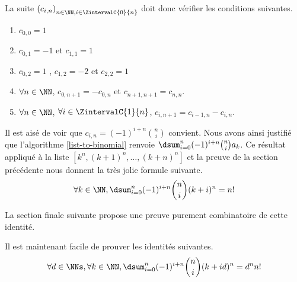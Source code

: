 La suite $\left(  c_{i,n} \right)_{n \in \NN , i \in \ZintervalC{0}{n}}$ doit donc vérifier les conditions suivantes.

\begin{enumerate}
	\item $c_{0,0} = 1$
	
	\item $c_{0,1} = -1$ et $c_{1, 1} = 1$

	\item $c_{0,2} = 1$ , $c_{1, 2} = -2$ et $c_{2, 2} = 1$

	\item $\forall n \in \NN$, $c_{0,n+1} = - c_{0,n}$ et $c_{n+1,n+1} = c_{n,n}$.

	\item $\forall n \in \NN$, $\forall i \in \ZintervalC{1}{n}$, $c_{i,n+1} = c_{i-1,n} - c_{i,n}$.
\end{enumerate}


Il est aisé de voir que $c_{i,n} = (-1)^{i+n} \binom{n}{i}$ convient. Nous avons ainsi justifié que l'algorithme \ref{list-to-binomial} renvoie $\dsum_{i=0}^{n} (-1)^{i+n} \binom{n}{i} a_k$.
Ce résultat appliqué à la liste $[ k^n , (k+1)^n , \dots , (k+n)^n ]$ et la preuve de la section précédente nous donnent la très jolie formule suivante.
\[ \forall k \in \NN, \dsum_{i=0}^{n} (-1)^{i+n} \binom{n}{i} (k+i)^n = n! \]


La section finale suivante propose une preuve purement combinatoire de cette identité.


\begin{remark}
	Il est maintenant facile de prouver les identités suivantes.
	\[ \forall d \in \NNs, \forall k \in \NN, \dsum_{i=0}^{n} (-1)^{i+n} \binom{n}{i} (k+id)^n = d^n n! \]
\end{remark}

